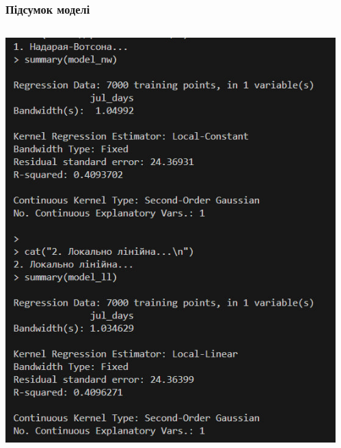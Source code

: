 \documentclass{beamer}
\begin{document}
\begin{frame}
  \frametitle{Підсумок моделі}
  \begin{columns}[T] 
  \begin{column}{0.48\textwidth} 
  \includegraphics[width=\textwidth]{plots/lab4/kernal/10.jpg}
  \end{column}
  \hfill
  \begin{column}{0.48\textwidth} 

\end{column}
\end{columns}
\end{frame}
\end{document}
